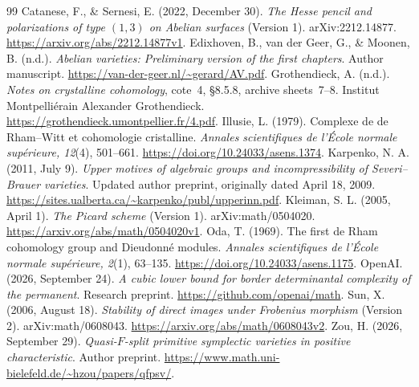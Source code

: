 \documentclass[11pt]{article}
\theoremstyle{definition}\newtheorem{definition}[theorem]{Definition}
\theoremstyle{remark}\newtheorem{remark}[theorem]{Remark}
\begin{document}
\begin{thebibliography}{99}
Catanese, F., \& Sernesi, E. (2022, December 30). \emph{The Hesse pencil and polarizations of type $(1,3)$ on Abelian surfaces} (Version 1). arXiv:2212.14877. \url{https://arxiv.org/abs/2212.14877v1}.
Edixhoven, B., van der Geer, G., \& Moonen, B. (n.d.). \emph{Abelian varieties: Preliminary version of the first chapters}. Author manuscript. \url{https://van-der-geer.nl/~gerard/AV.pdf}.
Grothendieck, A. (n.d.). \emph{Notes on crystalline cohomology}, cote~4, \S8.5.8, archive sheets~7--8. Institut Montpelli\'erain Alexander Grothendieck. \url{https://grothendieck.umontpellier.fr/4.pdf}.
Illusie, L. (1979). Complexe de de Rham--Witt et cohomologie cristalline. \emph{Annales scientifiques de l'\'Ecole normale sup\'erieure, 12}(4), 501--661. \url{https://doi.org/10.24033/asens.1374}.
Karpenko, N. A. (2011, July 9). \emph{Upper motives of algebraic groups and incompressibility of Severi--Brauer varieties}. Updated author preprint, originally dated April 18, 2009. \url{https://sites.ualberta.ca/~karpenko/publ/upperinn.pdf}.
Kleiman, S. L. (2005, April 1). \emph{The Picard scheme} (Version 1). arXiv:math/0504020. \url{https://arxiv.org/abs/math/0504020v1}.
Oda, T. (1969). The first de Rham cohomology group and Dieudonn\'e modules. \emph{Annales scientifiques de l'\'Ecole normale sup\'erieure, 2}(1), 63--135. \url{https://doi.org/10.24033/asens.1175}.
OpenAI. (2026, September 24). \emph{A cubic lower bound for border determinantal complexity of the permanent}. Research preprint. \url{https://github.com/openai/math}.
Sun, X. (2006, August 18). \emph{Stability of direct images under Frobenius morphism} (Version 2). arXiv:math/0608043. \url{https://arxiv.org/abs/math/0608043v2}.
Zou, H. (2026, September 29). \emph{Quasi-$F$-split primitive symplectic varieties in positive characteristic}. Author preprint. \url{https://www.math.uni-bielefeld.de/~hzou/papers/qfpsv/}.
\end{thebibliography}
\end{document}
